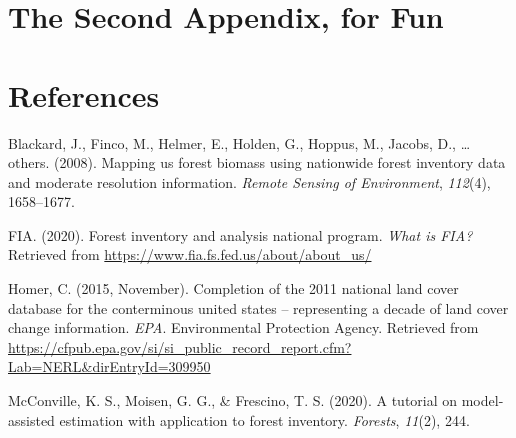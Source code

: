 \documentclass[12pt,twoside]{reedthesis}
\begin{document}
\hypertarget{the-second-appendix-for-fun}{%
\chapter{The Second Appendix, for Fun}\label{the-second-appendix-for-fun}}

\backmatter

\hypertarget{references}{%
\chapter*{References}\label{references}}


\noindent

\setlength{\parindent}{-0.20in}
\setlength{\leftskip}{0.20in}
\setlength{\parskip}{8pt}

\hypertarget{refs}{}
\leavevmode\hypertarget{ref-forbioforprob}{}%
Blackard, J., Finco, M., Helmer, E., Holden, G., Hoppus, M., Jacobs, D., \ldots{} others. (2008). Mapping us forest biomass using nationwide forest inventory data and moderate resolution information. \emph{Remote Sensing of Environment}, \emph{112}(4), 1658--1677.

\leavevmode\hypertarget{ref-whatisfia}{}%
FIA. (2020). Forest inventory and analysis national program. \emph{What is FIA?} Retrieved from \url{https://www.fia.fs.fed.us/about/about_us/}

\leavevmode\hypertarget{ref-nlcd11}{}%
Homer, C. (2015, November). Completion of the 2011 national land cover database for the conterminous united states -- representing a decade of land cover change information. \emph{EPA}. Environmental Protection Agency. Retrieved from \url{https://cfpub.epa.gov/si/si_public_record_report.cfm?Lab=NERL\&dirEntryId=309950}

\leavevmode\hypertarget{ref-mcconville2020}{}%
McConville, K. S., Moisen, G. G., \& Frescino, T. S. (2020). A tutorial on model-assisted estimation with application to forest inventory. \emph{Forests}, \emph{11}(2), 244.


\end{document}
